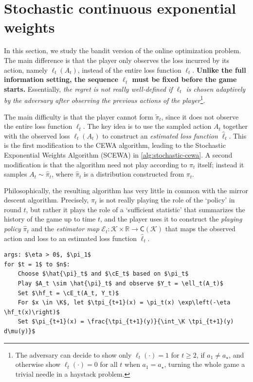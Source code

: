 \documentclass{article}
\theoremstyle{plain}
\theoremstyle{definition}
\theoremstyle{plain}
\newcommand{\R}{\mathbb R}
\newcommand{\K}{\mathcal K}
\newcommand{\cE}{\mathcal E}
\newcommand{\tpi}{\tilde{\pi}}
\newcommand{\cewaalg}{\textsf{CEWA}\xspace}
\newcommand{\scewaalg}{\textsf{SCEWA}\xspace}
\newcommand{\hf}{\hat{\ell}\xspace}
\begin{document}
\newpage
\section{Stochastic continuous exponential weights}
In this section, we study the bandit version of the online optimization problem.
The main difference is that the player only observes the loss incurred by its action,
namely $\ell_t(A_t)$, instead of the entire loss function $\ell_t$.
\textbf{Unlike the full information setting, the sequence $\ell_t$ must be fixed before the game starts.}
Essentially, \textit{the regret is not really well-defined if $\ell_t$ is chosen adaptively by the adversary after observing the previous actions of the player}\footnote{The adversary can decide to show only $\ell_t(\cdot)=1$ for $t\geq2$, if $a_1\neq a_\star$, and otherwise show $\ell_t(\cdot)=0$ for all $t$ when $a_1 = a_\star$, turning the whole game a trivial needle in a haystack problem.}.

The main difficulty is that the player cannot form $\tpi_t$, since it does not observe the entire loss function $\ell_t$.
The key idea is to use the sampled action $A_t$ together with the observed loss $\ell_t(A_t)$ to construct an \textit{estimated loss function} $\hf_t$.
This is the first modification to the \cewaalg algorithm, leading to the Stochastic Exponential Weights Algorithm (\scewaalg) in \cref{alg:stochastic-cewa}.
A second modification is that the algorithm need not play according to $\pi_t$ itself; instead it samples $A_t \sim \hat{\pi}_t$, where $\hat{\pi}_t$ is a distribution constructed from $\pi_t$.

Philosophically, the resulting algorithm has very little in common with the mirror descent algorithm.
Precisely, $\pi_t$ is not really playing the role of the `policy' in round $t$, but rather it plays the role of a `sufficient statistic' that summarizes the history of the game up to time $t$, and the player uses it to construct the \textit{playing policy} $\hat{\pi}_t$ and the \textit{estimator map} $\cE_t: \K \times \R \to \mathsf{C}(\K)$ that maps the observed action and loss to an estimated loss function $\hf_t$.

\begin{algorithm}[h!]
    \begin{minipage}{13cm}
        \begin{mdframed}
            \begin{lstlisting}
args: $\eta > 0$, $\pi_1$
for $t = 1$ to $n$:
    Choose $\hat{\pi}_t$ and $\cE_t$ based on $\pi_t$
    Play $A_t \sim \hat{\pi}_t$ and observe $Y_t = \ell_t(A_t)$
    Set $\hf_t = \cE_t(A_t, Y_t)$
    For $x \in \K$, let $\tpi_{t+1}(x) = \pi_t(x) \exp\left(-\eta \hf_t(x)\right)$
    Set $\pi_{t+1}(x) = \frac{\tpi_{t+1}(y)}{\int_\K \tpi_{t+1}(y) d\mu(y)}$
\end{lstlisting}
            \caption{\scewaalg algorithm.}\label{alg:stochastic-cewa}
        \end{mdframed}
    \end{minipage}
\end{algorithm}
\end{document}
